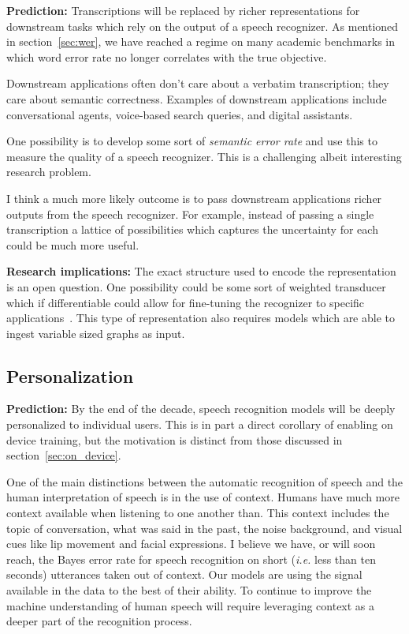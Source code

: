 {\bf Prediction:} Transcriptions will be replaced by richer representations for
downstream tasks which rely on the output of a speech recognizer. As mentioned
in section~\ref{sec:wer}, we have reached a regime on many academic benchmarks
in which word error rate no longer correlates with the true objective.

Downstream applications often don't care about a verbatim transcription; they
care about semantic correctness. Examples of downstream applications include
conversational agents, voice-based search queries, and digital assistants.

One possibility is to develop some sort of \emph{semantic error rate} and use
this to measure the quality of a speech recognizer. This is a challenging
albeit interesting research problem.

I think a much more likely outcome is to pass downstream applications richer
outputs from the speech recognizer. For example, instead of passing a single
transcription a lattice of possibilities which captures the uncertainty for
each could be much more useful.

{\bf Research implications:} The exact structure used to encode the
representation is an open question. One possibility could be some sort of
weighted transducer which if differentiable could allow for fine-tuning the
recognizer to specific applications~\cite{hannun2020differentiable, k2}. This
type of representation also requires models which are able to ingest variable
sized graphs as input.

\subsection{Personalization}

{\bf Prediction:} By the end of the decade, speech recognition models will be
deeply personalized to individual users. This is in part a direct
corollary of enabling on device training, but the motivation is distinct from
those discussed in section~\ref{sec:on_device}.

One of the main distinctions between the automatic recognition of speech and
the human interpretation of speech is in the use of context. Humans have much
more context available when listening to one another than. This context
includes the topic of conversation, what was said in the past, the noise
background, and visual cues like lip movement and facial expressions. I believe
we have, or will soon reach, the Bayes error rate for speech recognition on
short (\emph{i.e.} less than ten seconds) utterances taken out of context. Our
models are using the signal available in the data to the best of their ability.
To continue to improve the machine understanding of human speech will require
leveraging context as a deeper part of the recognition process.

